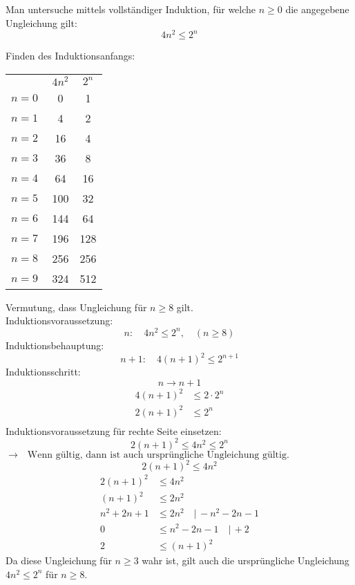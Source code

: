 \documentclass[a4paper, margins=3cm]{homework}
\begin{document}
\begin{problem}
	Man untersuche mittels vollständiger Induktion, für welche \(n \geq 0\) die angegebene Ungleichung gilt:
	\[4n^2 \leq 2^n\]
\end{problem}
\begin{solution}
	Finden des Induktionsanfangs:
	\begin{center}
			\begin{tabular}{lc|c}
				      & $4n^2$ & $2^n$ \\ \cline{2-3}
				$n=0\;$ & 0      & 1     \\
				$n=1\;$ & 4      & 2     \\
				$n=2\;$ & 16     & 4     \\
				$n=3\;$ & 36     & 8     \\
				$n=4\;$ & 64     & 16    \\
				$n=5\;$ & 100    & 32    \\
				$n=6\;$ & 144    & 64    \\
				$n=7\;$ & 196    & 128   \\
				$n=8\;$ & 256    & 256   \\
				$n=9\;$ & 324    & 512  
			\end{tabular}
	\end{center}
	Vermutung, dass Ungleichung für \(n \geq 8\) gilt. \\
	Induktionsvoraussetzung: \[ n:\quad 4n^2 \leq 2^n, \quad (n \geq 8) \]
	Induktionsbehauptung: \[ n+1:\quad 4(n+1)^2 \leq 2^{n+1} \]
	Induktionsschritt: \[n \rightarrow n+1\]
	\begin{align*}
		4(n+1)^2 &\leq 2 \cdot 2^n \\
		2(n+1)^2 &\leq 2^n \\
	\end{align*}
	Induktionsvoraussetzung für rechte Seite einsetzen:
	\[ 2(n+1)^2 \leq 4n^2 \leq 2^n \]
	\( \rightarrow \quad \text{Wenn gültig, dann ist auch ursprüngliche Ungleichung gültig.}\) \\
	\[ 2(n+1)^2 \leq 4n^2 \]
	\begin{align*}
		2(n+1)^2 &\leq 4n^2 \\
		(n+1)^2 &\leq 2n^2 \\
		n^2+2n+1 &\leq 2n^2 \quad |\, -n^2-2n-1 \\
		0 &\leq n^2-2n-1 \quad |\, +2 \\
		2 &\leq (n+1)^2
	\end{align*}
	Da diese Ungleichung für \(n \geq 3\) wahr ist, gilt auch die ursprüngliche Ungleichung \(4n^2\leq 2^n \) für \(n \geq 8\).

\end{solution}
\end{document}
